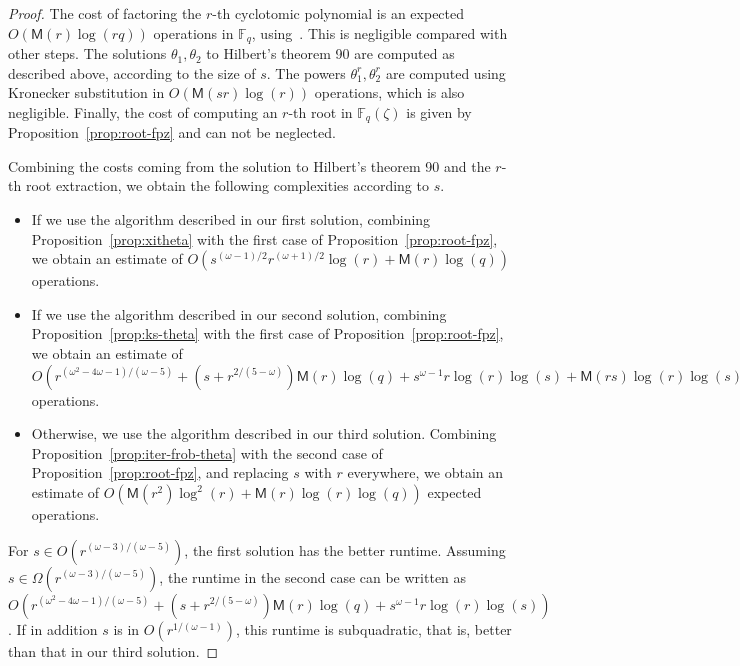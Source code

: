 \documentclass{mcom-l}
\theoremstyle{plain}
\theoremstyle{definition}
\newcommand{\F}{\ensuremath{\mathbb{F}}}
\newcommand{\MM}{\ensuremath{\mathsf{M}}}
\newcounter{algorithm}
\begin{document}
\begin{proof}
  The cost of factoring the $r$-th cyclotomic polynomial is an
  expected \sloppy $O(\MM(r)\log(rq))$ operations in $\F_q$,
  using~\cite[Theorem~9]{shoup94}. This is negligible compared with
  other steps. The solutions $\theta_1,\theta_2$ to Hilbert's theorem
  90 are computed as described above, according to the size of $s$.
  The powers $\theta_1^r,\theta_2^r$ are computed using Kronecker
  substitution in $O(\MM(sr)\log(r))$ operations, which is also
  negligible. Finally, the cost of computing an $r$-th root in
  $\F_q(\zeta)$ is given by Proposition~\ref{prop:root-fpz} and can
  not be neglected.

  Combining the costs coming from the solution to Hilbert's theorem 90
  and the $r$-th root extraction, we obtain the following complexities
  according to $s$.
  \begin{itemize}
  \item If we use the algorithm described in
    our first solution, combining Proposition~\ref{prop:xitheta} with the first
    case of Proposition~\ref{prop:root-fpz}, we obtain an estimate of
    $O(s^{(\omega-1)/2}r^{(\omega+1)/2}\log(r)+\MM(r)\log(q))$
    operations.
  \item If we use the algorithm described in
    our second solution, combining Proposition~\ref{prop:ks-theta} with the first
    case of Proposition~\ref{prop:root-fpz}, we obtain an estimate of
    $O( r^{(\omega^2-4\omega-1)/(\omega-5)}+(s+r^{2/(5-\omega)})\MM(r)\log(q)
+s^{\omega-1}r\log(r)\log(s)+\MM(rs)\log(r)\log(s))$
    operations.
  \item Otherwise, we use the algorithm described in our third solution. Combining
    Proposition~\ref{prop:iter-frob-theta} with the second case of
    Proposition~\ref{prop:root-fpz}, and replacing $s$ with $r$
    everywhere, we obtain an estimate of
    $O(\MM(r^2)\log^2(r) + \MM(r)\log(r)\log(q)) $ expected operations.
  \end{itemize}
  For $s\in O(r^{(\omega-3)/(\omega-5)})$, the first solution has the
  better runtime. Assuming $s\in \Omega(r^{(\omega-3)/(\omega-5)})$,
  the runtime in the second case can be written as $O(
  r^{(\omega^2-4\omega-1)/(\omega-5)}+(s+r^{2/(5-\omega)})\MM(r)\log(q)
  +s^{\omega-1}r\log(r)\log(s))$. If in addition $s$ is in $O(r^{1/(\omega-1)})$,
  this runtime is subquadratic, that is, better than that in our third solution.
\end{proof}
\end{document}
